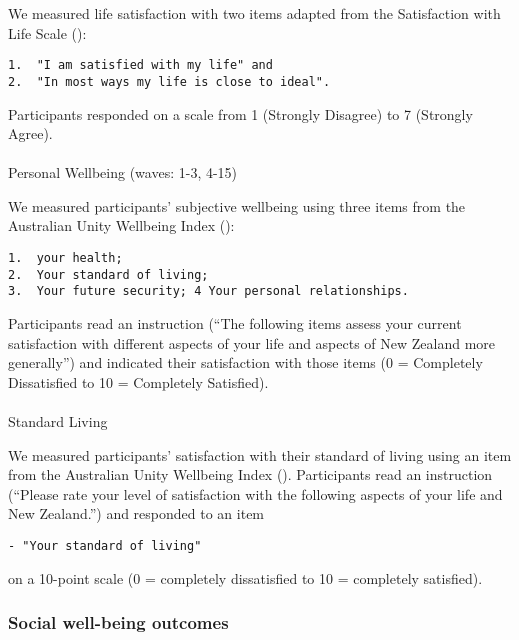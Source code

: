 \documentclass[
  singlecolumn,
  9pt]{article}
\makeatletter
\let\oldparagraph\paragraph
\renewcommand{\paragraph}{
    \@ifstar
      \xxxParagraphStar
      \xxxParagraphNoStar
  }
\newcommand{\xxxParagraphStar}[1]{\oldparagraph*{#1}\mbox{}}
\newcommand{\xxxParagraphNoStar}[1]{\oldparagraph{#1}\mbox{}}
\makeatother
\begin{document}
We measured life satisfaction with two items adapted from the
Satisfaction with Life Scale ():

\begin{verbatim}
1.  "I am satisfied with my life" and
2.  "In most ways my life is close to ideal".
\end{verbatim}

Participants responded on a scale from 1 (Strongly Disagree) to 7
(Strongly Agree).

\paragraph{Personal Wellbeing (waves: 1-3,
4-15)}\label{personal-wellbeing-waves-1-3-4-15}

We measured participants' subjective wellbeing using three items from
the Australian Unity Wellbeing Index
():

\begin{verbatim}
1.  your health;
2.  Your standard of living;
3.  Your future security; 4 Your personal relationships.
\end{verbatim}

Participants read an instruction (``The following items assess your
current satisfaction with different aspects of your life and aspects of
New Zealand more generally'') and indicated their satisfaction with
those items (0 = Completely Dissatisfied to 10 = Completely Satisfied).

\paragraph{Standard Living}\label{standard-living}

We measured participants' satisfaction with their standard of living
using an item from the Australian Unity Wellbeing Index
().
Participants read an instruction (``Please rate your level of
satisfaction with the following aspects of your life and New Zealand.'')
and responded to an item

\begin{verbatim}
- "Your standard of living"
\end{verbatim}

on a 10-point scale (0 = completely dissatisfied to 10 = completely
satisfied).

\subsubsection{Social well-being
outcomes}\label{social-well-being-outcomes}
\end{document}
